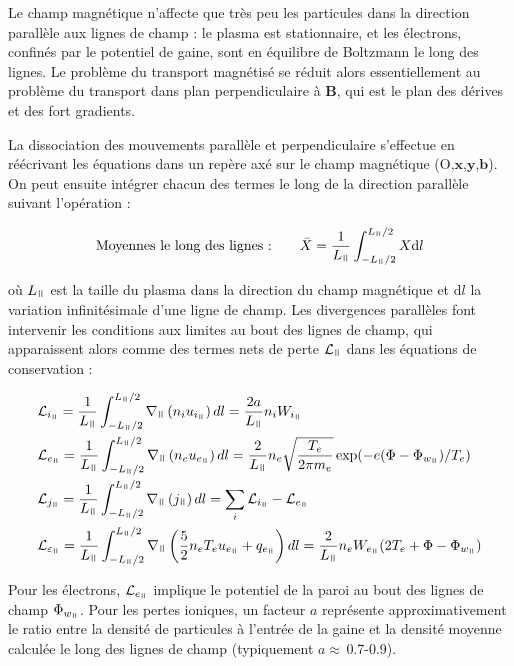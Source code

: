 \begin{refsection}
Le champ magnétique n'affecte que très peu les particules dans la direction
parallèle aux lignes de champ : le plasma est stationnaire, et les électrons,
confinés par le potentiel de gaine, sont en équilibre de Boltzmann le long des
lignes.
Le problème du transport magnétisé se réduit alors essentiellement au problème du transport
dans plan perpendiculaire à $\mathbf B$, qui est le plan des dérives et des
fort gradients.

La dissociation des mouvements parallèle et perpendiculaire s'effectue
en réécrivant les équations dans un repère axé sur le champ magnétique
(O,$\mathbf x$,$\mathbf y$,$\mathbf b$). On peut ensuite intégrer chacun des
termes le long de la direction parallèle suivant l'opération :

\begin{equation}
\text{Moyennes le long des lignes :\qquad}
\bar{X}=\frac{1}{L_\para}\int_{-L_\para/2}^{L_\para/2}X \text{d}l
\end{equation}

où $L_\para$ est la taille du plasma dans la direction du champ magnétique et
$\text{d}l$ la variation infinitésimale d'une ligne de champ.
Les divergences parallèles font intervenir les conditions aux limites au bout
des lignes de champ, qui apparaissent alors comme des termes nets de
perte $\mathcal L_\para$ dans les équations de conservation :

\begin{align}
\label{3-vitessesBord}
\begin{split}
\mathcal{L}&_{i_\para}=\frac{1}{L_\para}\int_{-L_\para/2}^{L_\para/2}\nabla_\para\left(n_iu_{i_\para}\right)dl=\frac{2a}{L_\para}n_iW_{i_\para}\\
\mathcal{L}&_{e_\para}=\frac{1}{L_\para}\int_{-L_\para/2}^{L_\para/2}\nabla_\para\left(n_eu_{e_\para}\right)dl=\frac{2}{L_\para}n_e\sqrt{\frac{T_e}{2\pi
m_e}}\exp(-e(\Phi-\Phi_{w_\para})/T_e)\\
\mathcal{L}&_{j_\para}=\frac{1}{L_\para}\int_{-L_\para/2}^{L_\para/2}\nabla_\para\left(j_\para\right)dl=\sum_i\mathcal{L}_{i_\para}-\mathcal{L}_{e_\para}\\
\mathcal{L}&_{\varepsilon_\para}=\frac{1}{L_\para}
\int_{-L_\para/2}^{L_\para/2}\nabla_\para
\left(\frac{5}{2}n_eT_eu_{e_\para}+q_{e_\para}\right)dl
=\frac{2}{L_\para}n_eW_{e_\para}(2T_e+\Phi-\Phi_{w_\para})
\end{split}
\end{align}

Pour les électrons, $\mathcal{L}_{e_\para}$ implique le potentiel de la
paroi au bout des lignes de champ $\Phi_{w_\para}$. Pour les pertes ioniques, un
facteur $a$ représente approximativement le ratio entre la densité de particules à l'entrée
de la gaine et la densité moyenne calculée le long des lignes de champ
(typiquement $a\approx\,$0.7-0.9).


\end{refsection}
